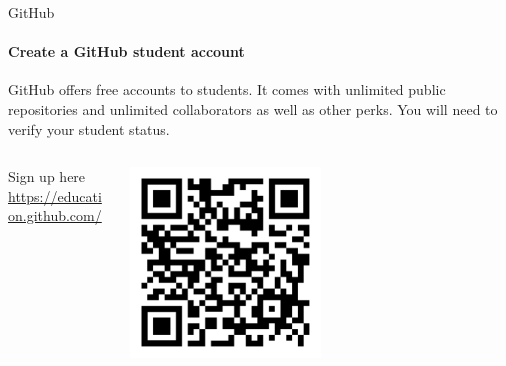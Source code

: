 \documentclass[
    aspectratio=169, 
    usepdftitle=false, 
    xcolor={dvipsnames},
    hyperref={
        colorlinks,
        linkcolor=black,
        urlcolor=blue}
    ]{beamer}
\begin{document}
\begin{frame}{GitHub}
    \framesubtitle{Create a GitHub student account}

    GitHub offers free accounts to students. It comes with unlimited public repositories and unlimited collaborators as well as other perks. You will need to verify your student status.

    \begin{columns}
        \begin{column}{0.5\textwidth}
            \begin{block}{Sign up here}
                \url{https://education.github.com/}
            \end{block}
        \end{column}
        \begin{column}{0.5\textwidth}  %
            \begin{center}
             \includegraphics[width=0.5\textwidth]{qr-code.pdf}
             \end{center}
        \end{column}
    \end{columns}
\end{frame}
\end{document}
